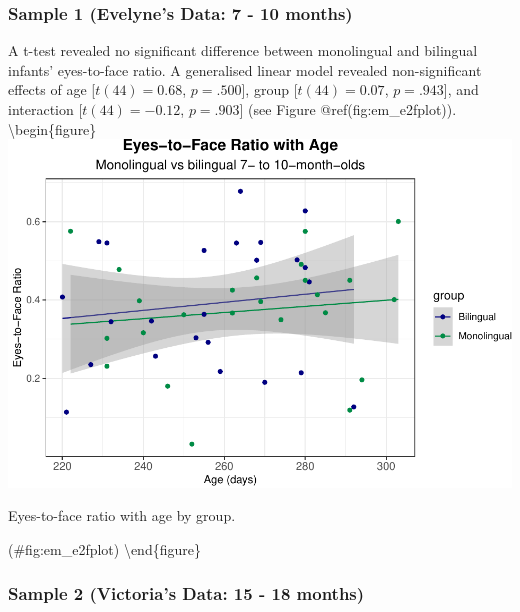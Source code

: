 \documentclass[english,man,floatsintext]{apa6}
\begin{document}
\hypertarget{sample-1-evelynes-data-7---10-months-3}{%
\subsubsection{Sample 1 (Evelyne's Data: 7 - 10 months)}\label{sample-1-evelynes-data-7---10-months-3}}

A t-test revealed no significant difference between monolingual and bilingual infants' eyes-to-face ratio. A generalised linear model revealed non-significant effects of age {[}\(t(44) = 0.68\), \(p = .500\){]}, group {[}\(t(44) = 0.07\), \(p = .943\){]}, and interaction {[}\(t(44) = -0.12\), \(p = .903\){]} (see Figure @ref(fig:em\_e2fplot)).
\textbackslash{}begin\{figure\}
\includegraphics{Effects_of_early_language_experience_on_infants_files/figure-latex/em_e2fplot-1}

\caption{Eyes-to-face ratio with age by group.}

(\#fig:em\_e2fplot)
\textbackslash{}end\{figure\}

\hypertarget{sample-2-victorias-data-15---18-months-3}{%
\subsubsection{Sample 2 (Victoria's Data: 15 - 18 months)}\label{sample-2-victorias-data-15---18-months-3}}
\end{document}
